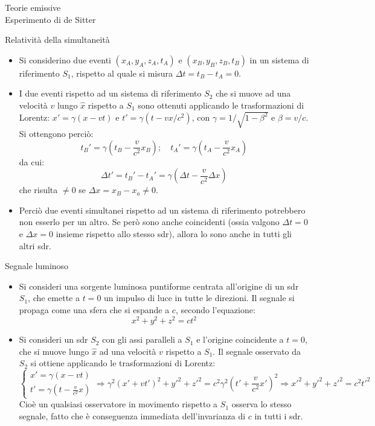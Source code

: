 \documentclass[a4_2,grid,frame]{flashcards}
\newenvironment{cartaflash}
    {\vspace{-15pt}
    \begin{itemize}
    }
    {
    \end{itemize}
    }
\begin{document}
\begin{flashcard}[Teoria]{Teorie emissive\\Esperimento di de Sitter}

\end{flashcard}


\begin{flashcard}[Conseguenza]{Relatività della simultaneità}
\begin{cartaflash}
\item Si considerino due eventi $(x_A, y_A, z_A, t_A)$ e $(x_B, y_B, z_B, t_B)$ in un sistema di riferimento $S_1$, rispetto al quale si misura $\Delta t = t_B - t_A = 0$.
\item I due eventi rispetto ad un sistema di riferimento $S_2$ che si muove ad una velocità $v$ lungo $\hat{x}$ rispetto a $S_1$ sono ottenuti applicando le trasformazioni di Lorentz: $x' = \gamma(x-vt)$ e $t'=\gamma(t-vx/c^2)$, con $\gamma = 1/\sqrt{1-\beta^2}$ e $\beta = v/c$. Si ottengono perciò:
\[
t_B' = \gamma\left (t_B - \frac{v}{c^2}x_B \right ); \quad t_A' = \gamma \left (t_A -\frac{v}{c^2}x_A \right )
\]
da cui:
\[
\Delta t' = t_B' - t_A' = \gamma\left ( \Delta t - \frac{v}{c^2}\Delta x \right ) 
\]
che risulta $\neq 0$ se $\Delta x = x_B-x_a \neq 0$.
\item Perciò due eventi simultanei rispetto ad un sistema di riferimento potrebbero non esserlo per un altro. Se però sono anche coincidenti (ossia valgono $\Delta t = 0$ e $\Delta x = 0$ insieme rispetto allo stesso sdr), allora lo sono anche in tutti gli altri sdr.
\end{cartaflash}
\end{flashcard}

\begin{flashcard}[Esempio]{Segnale luminoso}
\begin{cartaflash}
\item Si consideri una sorgente luminosa puntiforme centrata all'origine di un sdr $S_1$, che emette a $t=0$ un impulso di luce in tutte le direzioni. Il segnale si propaga come una sfera che si espande a $c$, secondo l'equazione:
\[
x^2+y^2+z^2 = ct^2
\]
\item Si consideri un sdr $S_2$ con gli assi paralleli a $S_1$ e l'origine coincidente a $t=0$, che si muove lungo $\hat{x}$ ad una velocità $v$ rispetto a $S_1$. Il segnale osservato da $S_2$ si ottiene applicando le trasformazioni di Lorentz:
\[
\begin{cases}
x' = \gamma(x-vt)\\
t' = \gamma\left (t-\frac{v}{c^2}x \right ) 
\end{cases} \Rightarrow \gamma^2(x'+vt')^2 + y'^2 + z'^2 = c^2\gamma^2\left (t'+\frac{v}{c^2}x' \right )^2 \Rightarrow x'^2 + y'^2 + z'^2 = c^2 t'^2
\]
Cioè un qualsiasi osservatore in movimento rispetto a $S_1$ osserva lo stesso segnale, fatto che è conseguenza immediata dell'invarianza di $c$ in tutti i sdr.
\end{cartaflash}
\end{flashcard}
\end{document}
